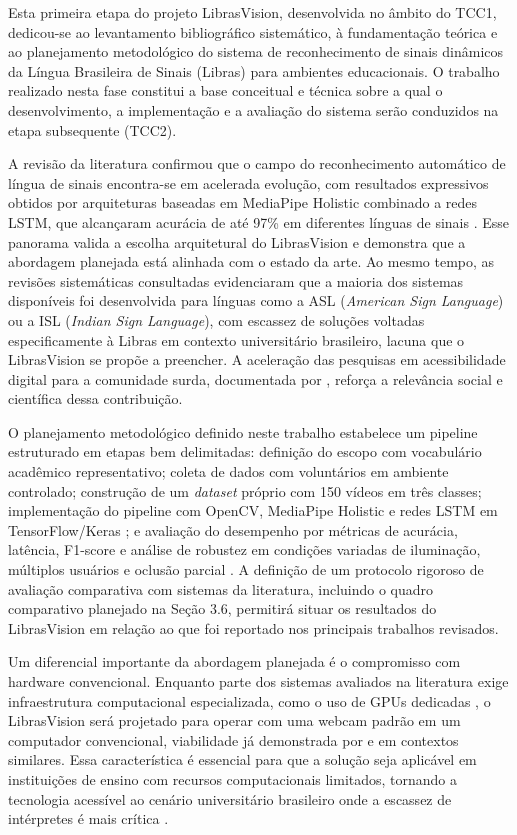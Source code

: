 
Esta primeira etapa do projeto LibrasVision, desenvolvida no âmbito do TCC1, dedicou-se ao levantamento bibliográfico sistemático, à fundamentação teórica e ao planejamento metodológico do sistema de reconhecimento de sinais dinâmicos da Língua Brasileira de Sinais (Libras) para ambientes educacionais. O trabalho realizado nesta fase constitui a base conceitual e técnica sobre a qual o desenvolvimento, a implementação e a avaliação do sistema serão conduzidos na etapa subsequente (TCC2).

A revisão da literatura confirmou que o campo do reconhecimento automático de língua de sinais encontra-se em acelerada evolução, com resultados expressivos obtidos por arquiteturas baseadas em MediaPipe Holistic combinado a redes LSTM, que alcançaram acurácia de até 97\% em diferentes línguas de sinais \cite{anithadevi:25,varshini:25}. Esse panorama valida a escolha arquitetural do LibrasVision e demonstra que a abordagem planejada está alinhada com o estado da arte. Ao mesmo tempo, as revisões sistemáticas consultadas \cite{costa-slr:25,silva-ia:25} evidenciaram que a maioria dos sistemas disponíveis foi desenvolvida para línguas como a ASL (\textit{American Sign Language}) ou a ISL (\textit{Indian Sign Language}), com escassez de soluções voltadas especificamente à Libras em contexto universitário brasileiro, lacuna que o LibrasVision se propõe a preencher. A aceleração das pesquisas em acessibilidade digital para a comunidade surda, documentada por , reforça a relevância social e científica dessa contribuição.

O planejamento metodológico definido neste trabalho estabelece um pipeline estruturado em etapas bem delimitadas: definição do escopo com vocabulário acadêmico representativo; coleta de dados com voluntários em ambiente controlado; construção de um \textit{dataset} próprio com 150 vídeos em três classes; implementação do pipeline com OpenCV, MediaPipe Holistic e redes LSTM em TensorFlow/Keras \cite{kamble:25}; e avaliação do desempenho por métricas de acurácia, latência, F1-score e análise de robustez em condições variadas de iluminação, múltiplos usuários e oclusão parcial \cite{attili:24}. A definição de um protocolo rigoroso de avaliação comparativa com sistemas da literatura, incluindo o quadro comparativo planejado na Seção 3.6, permitirá situar os resultados do LibrasVision em relação ao que foi reportado nos principais trabalhos revisados.

Um diferencial importante da abordagem planejada é o compromisso com hardware convencional. Enquanto parte dos sistemas avaliados na literatura exige infraestrutura computacional especializada, como o uso de GPUs dedicadas \cite{fanucchi:24}, o LibrasVision será projetado para operar com uma webcam padrão em um computador convencional, viabilidade já demonstrada por  e  em contextos similares. Essa característica é essencial para que a solução seja aplicável em instituições de ensino com recursos computacionais limitados, tornando a tecnologia acessível ao cenário universitário brasileiro onde a escassez de intérpretes é mais crítica \cite{dockens:18}.

